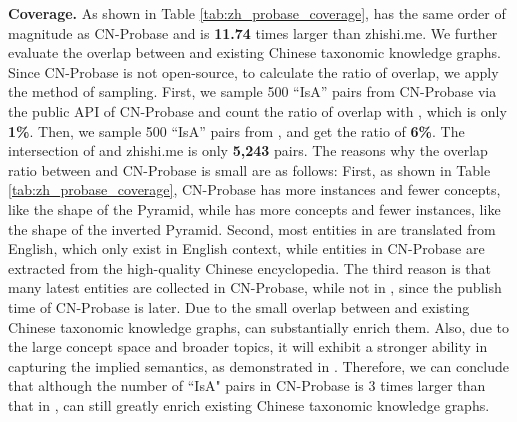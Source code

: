 \textbf{Coverage.}
As shown in Table \ref{tab:zh_probase_coverage}, \zhpro has the same order of magnitude as CN-Probase and is \textbf{11.74} times larger than zhishi.me. 
We further evaluate the overlap between \zhpro and existing Chinese taxonomic knowledge graphs.
Since CN-Probase is not open-source, to calculate the ratio of overlap, we apply the method of sampling. First, we sample 500 ``IsA'' pairs from CN-Probase via the public API of CN-Probase and count the ratio of overlap with \zhpro, which is only \textbf{1\%}. Then, we sample 500 ``IsA'' pairs from \zhpro, and get the ratio of \textbf{6\%}. The intersection of \zhpro and zhishi.me is only \textbf{5,243} pairs.
The reasons why the overlap ratio between \zhpro and CN-Probase is small are as follows: First, as shown in Table \ref{tab:zh_probase_coverage}, CN-Probase has more instances and fewer concepts, like the shape of the Pyramid, while \zhpro has more concepts and fewer instances, like the shape of the inverted Pyramid. 
Second, most entities in \zhpro are translated from English, which only exist in English context, while entities in CN-Probase are extracted from the high-quality Chinese encyclopedia. The third reason is that many latest entities are collected in CN-Probase, while not in \zhpro, since the publish time of CN-Probase is later.
Due to the small overlap between \zhpro and existing Chinese taxonomic knowledge graphs, \zhpro can substantially enrich them. Also, due to the large concept space and broader topics, it will exhibit a stronger ability in capturing the implied semantics, as demonstrated in \cite{wang2010toward}.
Therefore, we can conclude that although the number of ``IsA" pairs in CN-Probase is 3 times larger than that in \zhpro, \zhpro can still greatly enrich existing Chinese taxonomic knowledge graphs.



